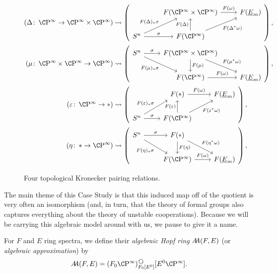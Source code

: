 \begin{figure}
\begin{align*}
(\Delta\co \CP^\infty \to \CP^\infty \times \CP^\infty) & \leadsto
\left(
\begin{tikzcd}[ampersand replacement=\&]
\& F(\CP^\infty \times \CP^\infty) \arrow["F(\omega)"]{r} \& F(\OS{E}{m}) \\
S^n \arrow["\sigma"]{r} \arrow["F(\Delta)_* \sigma"]{ru} \& F(\CP^\infty) \arrow["F(\Delta)"]{u} \arrow["F(\Delta^* \omega)"']{ru}
\end{tikzcd}
\right), \\
(\mu\co \CP^\infty \times \CP^\infty \to \CP^\infty) & \leadsto
\left(
\begin{tikzcd}[ampersand replacement=\&]
S^n \arrow["\sigma"]{r} \arrow["F(\mu)_* \sigma"']{rd} \& F(\CP^\infty \times \CP^\infty) \arrow["F(\mu)"]{d} \arrow["F(\mu^* \omega)"]{rd} \\
\& F(\CP^\infty) \arrow["F(\omega)"]{r} \& F(\OS{E}{m})
\end{tikzcd}
\right), \\
(\eps\co \CP^\infty \to *) & \leadsto
\left(
\begin{tikzcd}[ampersand replacement=\&]
\& F(*) \arrow["F(\omega)"]{r} \& F(\OS{E}{m}) \\
S^n \arrow["\sigma"]{r} \arrow["F(\eps)_* \sigma"]{ru} \& F(\CP^\infty) \arrow["F(\eps)"]{u} \arrow["F(\eps^* \omega)"']{ru}
\end{tikzcd}
\right), \\
(\eta\co * \to \CP^\infty) & \leadsto
\left(
\begin{tikzcd}[ampersand replacement=\&]
S^n \arrow["\sigma"]{r} \arrow["F(\eta)_* \sigma"']{rd} \& F(*) \arrow["F(\eta)"]{d} \arrow["F(\eta^* \omega)"]{rd} \\
\& F(\CP^\infty) \arrow["F(\omega)"]{r} \& F(\OS{E}{m})
\end{tikzcd}
\right),
\end{align*}
\caption{Four topological Kronecker pairing relations.}\label{KroneckerPairingFigure}
\end{figure}

The main theme of this Case Study is that this induced map off of the quotient is very often an isomorphism (and, in turn, that the theory of formal groups also captures everything about the theory of unstable cooperations).  Because we will be carrying this algebraic model around with us, we pause to give it a name.

\begin{definition}
For \(F\) and \(E\) ring spectra, we define their \textit{algebraic Hopf ring} \(\AA(F, E)\) (or \textit{algebraic approximation}) by \[\AA(F, E) = (F_0 \CP^\infty)_{F_0[E^0]}^{\circulatearrows}[E^0 \CP^\infty].\]
\end{definition}

